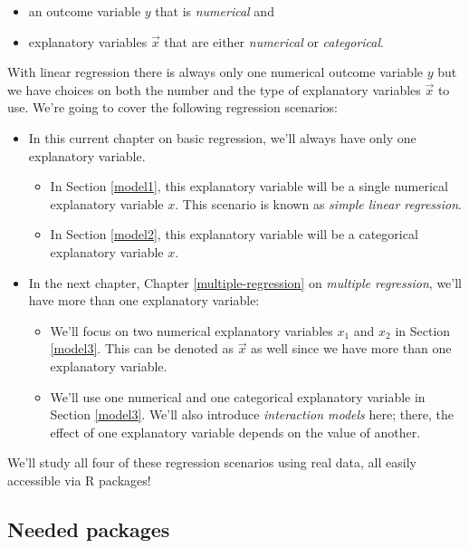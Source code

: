 \documentclass[12pt, krantz2,]{krantz}
\providecommand{\tightlist}{%
  \setlength{\itemsep}{0pt}\setlength{\parskip}{0pt}}
\begin{document}
\begin{itemize}
\tightlist
\item
  an outcome variable \(y\) that is \emph{numerical} and
\item
  explanatory variables \(\vec{x}\) that are either \emph{numerical} or \emph{categorical}.
\end{itemize}

With linear regression there is always only one numerical outcome variable \(y\) but we have choices on both the number and the type of explanatory variables \(\vec{x}\) to use. We're going to cover the following regression scenarios:

\begin{itemize}
\tightlist
\item
  In this current chapter on basic regression, we'll always have only one explanatory variable.

  \begin{itemize}
  \tightlist
  \item
    In Section \ref{model1}, this explanatory variable will be a single numerical explanatory variable \(x\). This scenario is known as \emph{simple linear regression}.
  \item
    In Section \ref{model2}, this explanatory variable will be a categorical explanatory variable \(x\).
  \end{itemize}
\item
  In the next chapter, Chapter \ref{multiple-regression} on \emph{multiple regression}, we'll have more than one explanatory variable:

  \begin{itemize}
  \tightlist
  \item
    We'll focus on two numerical explanatory variables \(x_1\) and \(x_2\) in Section \ref{model3}. This can be denoted as \(\vec{x}\) as well since we have more than one explanatory variable.
  \item
    We'll use one numerical and one categorical explanatory variable in Section \ref{model3}. We'll also introduce \emph{interaction models} here; there, the effect of one explanatory variable depends on the value of another.
  \end{itemize}
\end{itemize}

We'll study all four of these regression scenarios using real data, all easily accessible via R packages!

\hypertarget{needed-packages-3}{%
\subsection*{Needed packages}\label{needed-packages-3}}
\end{document}
